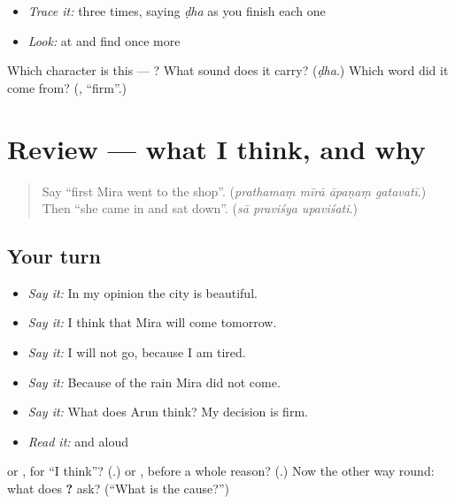 \begin{quote}
\end{quote}

\begin{itemize}
\raggedright
  \item \emph{Trace it:}  three times, saying \emph{ḍha} as you finish each one
  \item \emph{Look:} at \textbf{  } and find  once more
\end{itemize}

\begin{tcolorbox}[breakable,colback=teal!4,colframe=teal!35!black,title={Before you move on}]
Which character is this — ? What sound does it carry? (\emph{ḍha}.) Which word did it come from? (\textbf{}, \textquotedblleft{}firm\textquotedblright{}.)
\end{tcolorbox}
\section[(review)]{Review — what I think, and why}

\label{lesson:SA-R278-opinion-and-reason}



\begin{quote}
Say \textquotedblleft{}first Mira went to the shop\textquotedblright{}. (\emph{prathamaṃ mīrā āpaṇaṃ gatavatī}.) Then \textquotedblleft{}she came in and sat down\textquotedblright{}. (\emph{sā praviśya upaviśati}.)
\end{quote}

\subsection*{Your turn}
\begin{itemize}
\raggedright
  \item \emph{Say it:} In my opinion the city is beautiful.
  \item \emph{Say it:} I think that Mira will come tomorrow.
  \item \emph{Say it:} I will not go, because I am tired.
  \item \emph{Say it:} Because of the rain Mira did not come.
  \item \emph{Say it:} What does Arun think? My decision is firm.
  \item \emph{Read it:} \textbf{} and \textbf{   } aloud
\end{itemize}

\begin{tcolorbox}[breakable,colback=teal!4,colframe=teal!35!black,title={Before you move on}]
\textbf{} or \textbf{}, for \textquotedblleft{}I think\textquotedblright{}? (\textbf{}.) \textbf{} or \textbf{}, before a whole reason? (\textbf{}.) Now the other way round: what does \textbf{ ?} ask? (\textquotedblleft{}What is the cause?\textquotedblright{})
\end{tcolorbox}
